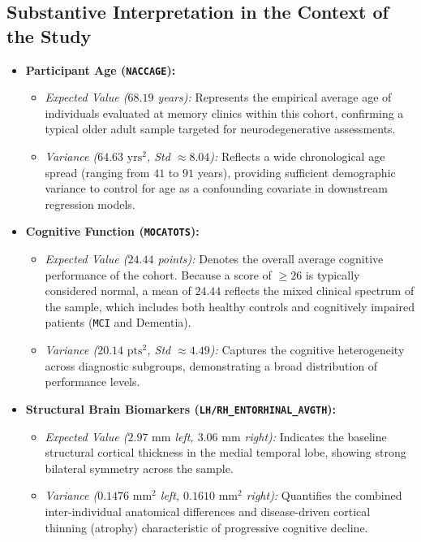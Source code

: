 \documentclass[11pt, a4paper]{article}
\begin{document}
\subsection{Substantive Interpretation in the Context of the Study}
\begin{itemize}
    \item \textbf{Participant Age (\texttt{NACCAGE}):}
    \begin{itemize}
        \item \textit{Expected Value ($68.19$ years):} Represents the empirical average age of individuals evaluated at memory clinics within this cohort, confirming a typical older adult sample targeted for neurodegenerative assessments.
        \item \textit{Variance ($64.63\text{ yrs}^2$, Std $\approx 8.04$):} Reflects a wide chronological age spread (ranging from $41$ to $91$ years), providing sufficient demographic variance to control for age as a confounding covariate in downstream regression models.
    \end{itemize}
    \item \textbf{Cognitive Function (\texttt{MOCATOTS}):}
    \begin{itemize}
        \item \textit{Expected Value ($24.44$ points):} Denotes the overall average cognitive performance of the cohort. Because a score of $\ge 26$ is typically considered normal, a mean of $24.44$ reflects the mixed clinical spectrum of the sample, which includes both healthy controls and cognitively impaired patients (\texttt{MCI} and Dementia).
        \item \textit{Variance ($20.14\text{ pts}^2$, Std $\approx 4.49$):} Captures the cognitive heterogeneity across diagnostic subgroups, demonstrating a broad distribution of performance levels.
    \end{itemize}
    \item \textbf{Structural Brain Biomarkers (\texttt{LH/RH\_ENTORHINAL\_AVGTH}):}
    \begin{itemize}
        \item \textit{Expected Value ($2.97\text{ mm}$ left, $3.06\text{ mm}$ right):} Indicates the baseline structural cortical thickness in the medial temporal lobe, showing strong bilateral symmetry across the sample.
        \item \textit{Variance ($0.1476\text{ mm}^2$ left, $0.1610\text{ mm}^2$ right):} Quantifies the combined inter-individual anatomical differences and disease-driven cortical thinning (atrophy) characteristic of progressive cognitive decline.
    \end{itemize}
\end{itemize}
\end{document}
